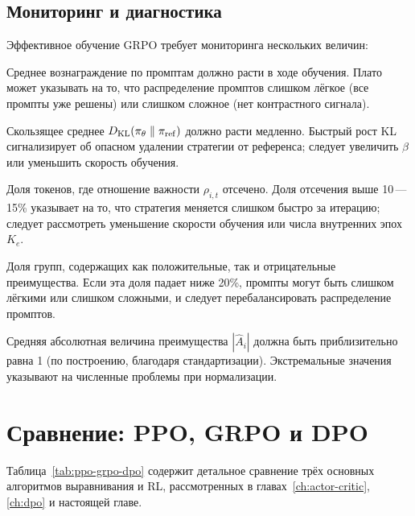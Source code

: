\subsection{Мониторинг и диагностика}

Эффективное обучение GRPO требует мониторинга нескольких величин:
\begin{description}[leftmargin=!,labelwidth=3.5cm,align=parleft]
  \item[Кривая вознаграждения] Среднее вознаграждение по промптам должно расти в ходе обучения. Плато может указывать на то, что распределение промптов слишком лёгкое (все промпты уже решены) или слишком сложное (нет контрастного сигнала).
  \item[Дивергенция KL] Скользящее среднее $D_{\mathrm{KL}}\!\left(\pi_\theta\;\|\;\pi_\mathrm{ref}\right)$ должно расти медленно. Быстрый рост KL сигнализирует об опасном удалении стратегии от референса; следует увеличить $\beta$ или уменьшить скорость обучения.
  \item[Доля отсечения] Доля токенов, где отношение важности $\rho_{i,t}$ отсечено. Доля отсечения выше 10\,---\,15\% указывает на то, что стратегия меняется слишком быстро за итерацию; следует рассмотреть уменьшение скорости обучения или числа внутренних эпох $K_e$.
  \item[Разнообразие групп] Доля групп, содержащих как положительные, так и отрицательные преимущества. Если эта доля падает ниже 20\%, промпты могут быть слишком лёгкими или слишком сложными, и следует перебалансировать распределение промптов.
  \item[Величина преимущества] Средняя абсолютная величина преимущества $|\hat{A}_i|$ должна быть приблизительно равна 1 (по построению, благодаря стандартизации). Экстремальные значения указывают на численные проблемы при нормализации.
\end{description}

\section{Сравнение: PPO, GRPO и DPO}
\label{sec:grpo-comparison}

Таблица~\ref{tab:ppo-grpo-dpo} содержит детальное сравнение трёх основных алгоритмов выравнивания и RL, рассмотренных в главах~\ref{ch:actor-critic}, \ref{ch:dpo} и настоящей главе.

